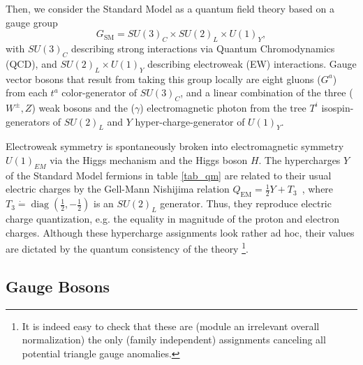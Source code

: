 Then, we consider the Standard Model as a quantum field theory based on a gauge group
\begin{equation}
	G_{\mathrm{SM}}=S U(3)_C \times S U(2)_{L} \times U(1)_{Y},
\end{equation}
with $S U(3)_C$ describing strong interactions via Quantum Chromodynamics (QCD), and $S U(2)_{L} \times U(1)_{Y}$ describing electroweak (EW) interactions. Gauge vector bosons that result from taking this group locally are eight gluons ($G^a$) from each $t^a$ color-generator of $SU(3)_C$, and a linear combination of the three ($W^\pm, Z$) weak bosons and the ($\gamma$) electromagnetic photon from the tree $T^i$ isospin-generators of $SU(2)_L$ and $Y$ hyper-charge-generator of $U(1)_Y$.

Electroweak symmetry is spontaneously broken into electromagnetic symmetry $U(1)_{EM}$ via the Higgs mechanism and the Higgs boson $H$. The hypercharges $Y$ of the Standard Model fermions in table \ref{tab_qm} are related to their usual electric charges by the Gell-Mann Nishijima relation $Q_{\mathrm{EM}}=\frac12Y+T_{3}$~\parencite{10.1143/PTP.10.581}, where $T_{3}\dot=\operatorname{diag}\left(\frac{1}{2},-\frac{1}{2}\right)$ is an $S U(2)_{L}$ generator.  Thus, they reproduce electric charge quantization, e.g. the equality in magnitude of the proton and electron charges. Although these hypercharge assignments look rather ad hoc, their values are dictated by the quantum consistency of the theory \footnote{It is indeed easy to check that these are (module an irrelevant overall normalization) the only (family independent) assignments canceling all potential triangle gauge anomalies.}. 

\subsection{Gauge Bosons}

